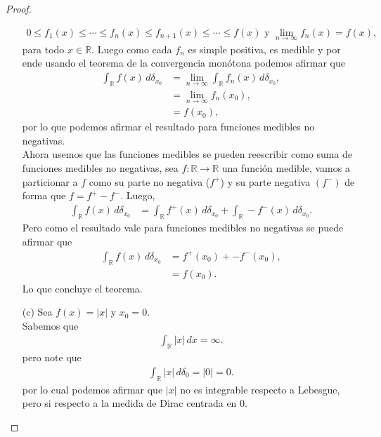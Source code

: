 \begin{proof}
\begin{enumerate}
      \begin{align*}
        0\leq f_{1}(x)\leq\cdots\leq f_n(x)\leq f_{n+1}(x)\leq \cdots \leq f(x) \text{ y }  \lim_{n \to \infty} f_n(x) = f(x),  
      \end{align*}
      para todo $x \in \mathbb{R}$. Luego como cada $f_{n}$ es simple positiva, es medible y por ende usando el teorema de la convergencia monótona podemos afirmar que
      \begin{align*}
        \int_{\mathbb{R}} f(x) \, d\delta_{x_0} &= \lim_{n \to \infty} \int_{\mathbb{R}} f_n(x) \, d\delta_{x_0},\\
        &= \lim_{n \to \infty} f_n(x_0),\\
        &= f(x_0),       
      \end{align*}
      por lo que podemos afirmar el resultado para funciones medibles no negativas.\\
      Ahora usemos que las funciones medibles se pueden reescribir como suma de funciones medibles no negativas, sea $f: \mathbb{R} \to \mathbb{R}$ una función medible, vamos a particionar a $f$ como su parte no negativa ($f^{+}$) y su parte negativa $(f^{-})$ de forma que $f = f^+ - f^-$. Luego,
      \begin{align*}
        \int_{\mathbb{R}} f(x) \, d\delta_{x_0} &= \int_{\mathbb{R}} f^+(x) \, d\delta_{x_0} + \int_{\mathbb{R}} -f^-(x) \, d\delta_{x_0}.       
      \end{align*}
      Pero como el resultado vale para funciones medibles no negativas se puede afirmar que
      \begin{align*}
        \int_{\mathbb{R}} f(x) \, d\delta_{x_0} &= f^+(x_0) + -f^-(x_0),\\
        &= f(x_0).       
      \end{align*}
      Lo que concluye el teorema.
     \item[(c)] Sea $f(x)=|x|$ y $x_0=0$.\\
      Sabemos que
      \begin{align*}
        \int_{\mathbb{R}}|x|\, dx=\infty.
      \end{align*}
      pero note que
      \begin{align*}
        \int_{\mathbb{R}}|x|\, d\delta_{0}=|0|=0.
      \end{align*}
      por lo cual podemos afirmar que $|x|$ no es integrable respecto a Lebesgue, pero si respecto a la medida de Dirac centrada en $0$. 
  \end{enumerate} 
\end{proof}


